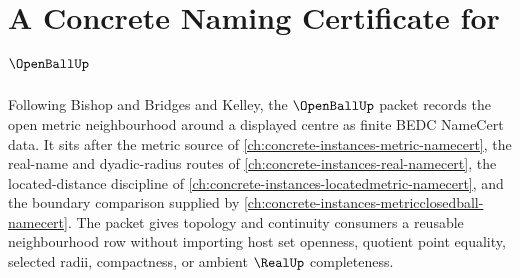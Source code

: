 \chapter{A Concrete Naming Certificate for $\OpenBallUp$}
\label{ch:concrete-instances-open-ball-namecert}

Following Bishop and Bridges and Kelley, the $\OpenBallUp$ packet records the open metric neighbourhood around a displayed centre as finite BEDC NameCert data. It sits after the metric source of \autoref{ch:concrete-instances-metric-namecert}, the real-name and dyadic-radius routes of \autoref{ch:concrete-instances-real-namecert}, the located-distance discipline of \autoref{ch:concrete-instances-locatedmetric-namecert}, and the boundary comparison supplied by \autoref{ch:concrete-instances-metricclosedball-namecert}. The packet gives topology and continuity consumers a reusable neighbourhood row without importing host set openness, quotient point equality, selected radii, compactness, or ambient $\RealUp$ completeness.

